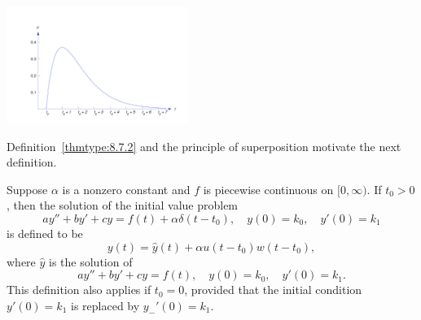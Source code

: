 \documentclass{ximera}
\begin{document}
\begin{image}
 \includegraphics[height=1.5in]{fig080703.jpg}
\end{image}


Definition~\ref{thmtype:8.7.2} and the principle of superposition
motivate the next definition.

\begin{definition}\label{thmtype:8.7.3} Suppose
$\alpha$ is a nonzero constant and
$f$ is
piecewise continuous on $[0,\infty)$.
If $t_0>0$, then the solution of  the  initial value problem
$$
ay''+by'+cy=f(t)+\alpha\delta(t-t_0), \quad  y(0)=k_0,\quad y'(0)=k_1
$$
is defined to be
$$
y(t)=\hat y(t)+\alpha u(t-t_0)w(t-t_0),
$$
where $\hat y$  is the solution of
$$
ay''+by'+cy=f(t), \quad  y(0)=k_0,\quad y'(0)=k_1.
$$
This definition also applies if $t_0=0$, provided that the initial
condition $y'(0)=k_1$ is replaced by $y_-'(0)=k_1$.
\end{definition}
\end{document}
